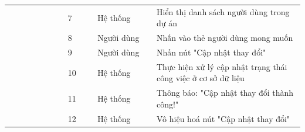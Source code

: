\documentclass[../DoAn.tex]{subfiles}
\begin{document}
\begin{table}[ht]
\begin{tabular}{| p{0.2\linewidth} | p{0.1\linewidth} | p{0.2\linewidth} | p{0.5\linewidth} |}
                                                                     & \multicolumn{1}{p{0.1\linewidth}|}{7}                                                              & \multicolumn{1}{p{0.2\linewidth}|}{Hệ thống}               & \multicolumn{1}{p{0.5\linewidth}|}{Hiển thị danh sách người dùng trong dự án}                                                  \\ \cline{2-4}
                                                                     & \multicolumn{1}{p{0.1\linewidth}|}{8}                                                              & \multicolumn{1}{p{0.2\linewidth}|}{Người dùng}             & \multicolumn{1}{p{0.5\linewidth}|}{Nhấn vào thẻ người dùng mong muốn}                                                          \\ \cline{2-4}
                                                                     & \multicolumn{1}{p{0.1\linewidth}|}{9}                                                              & \multicolumn{1}{p{0.2\linewidth}|}{Người dùng}             & \multicolumn{1}{p{0.5\linewidth}|}{Nhấn nút "Cập nhật thay đổi"}                                                               \\ \cline{2-4}
                                                                     & \multicolumn{1}{p{0.1\linewidth}|}{10}                                                             & \multicolumn{1}{p{0.2\linewidth}|}{Hệ thống}               & \multicolumn{1}{p{0.5\linewidth}|}{Thực hiện xử lý cập nhật trạng thái công việc ở cơ sở dữ liệu}                              \\ \cline{2-4}
                                                                     & \multicolumn{1}{p{0.1\linewidth}|}{11}                                                             & \multicolumn{1}{p{0.2\linewidth}|}{Hệ thống}               & \multicolumn{1}{p{0.5\linewidth}|}{Thông báo: "Cập nhật thay đổi thành công!"}                                                 \\ \cline{2-4}
                                                                     & \multicolumn{1}{p{0.1\linewidth}|}{12}                                                             & \multicolumn{1}{p{0.2\linewidth}|}{Hệ thống}               & \multicolumn{1}{p{0.5\linewidth}|}{Vô hiệu hoá nút "Cập nhật thay đổi"}                                                        \\ \hline


\end{tabular}
\end{table}
\end{document}
